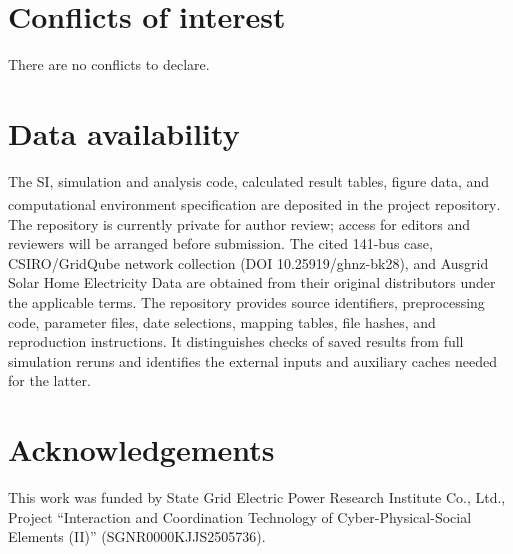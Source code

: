 \documentclass[twoside,twocolumn,9pt]{article}
\begin{document}
\section*{Conflicts of interest}
There are no conflicts to declare.

\section*{Data availability}
The SI, simulation and analysis code, calculated result tables, figure data,
and computational environment specification are deposited in the project
repository\textsuperscript{\dag}. The repository is currently private for author
review; access for editors and reviewers will be arranged before submission.
The cited 141-bus case, CSIRO/GridQube network collection (DOI
10.25919/ghnz-bk28), and Ausgrid Solar Home Electricity Data are obtained from
their original distributors under the applicable terms. The repository provides
source identifiers, preprocessing code, parameter files, date selections,
mapping tables, file hashes, and reproduction instructions. It distinguishes
checks of saved results from full simulation reruns and identifies the
external inputs and auxiliary caches needed for the latter.

\section*{Acknowledgements}
This work was funded by State Grid Electric Power Research Institute
Co., Ltd., Project ``Interaction and Coordination Technology of
Cyber-Physical-Social Elements (II)'' (SGNR0000KJJS2505736).

\vfuzz=2pt
\begingroup
{}
\setlength{\bibsep}{0pt}
\let\ECForiginalbibitem\bibitem
\renewcommand{\bibitem}[2][]{%
  \def\ECFcurrentkey{#2}\def\ECFbalancekey{mallaki2021strategic}%
  \ifx\ECFcurrentkey\ECFbalancekey\balance\fi
  \ECForiginalbibitem[#1]{#2}}


\endgroup
\end{document}
